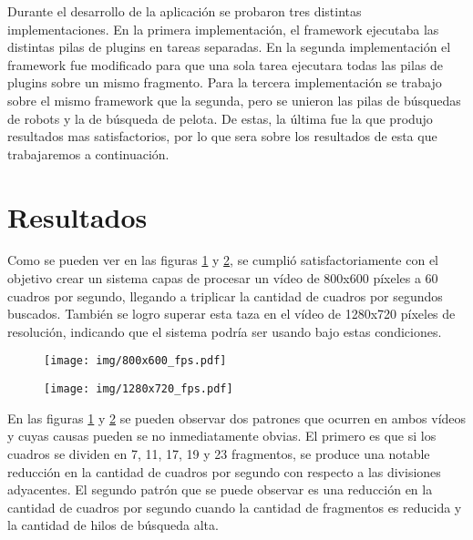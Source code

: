 Durante el desarrollo de la aplicación se probaron tres distintas
implementaciones. En la primera implementación, el framework ejecutaba las
distintas pilas de plugins en tareas separadas. En la segunda implementación el
framework fue modificado para que una sola tarea ejecutara todas las pilas de
plugins sobre un mismo fragmento. Para la tercera implementación se trabajo
sobre el mismo framework que la segunda, pero se unieron las pilas de búsquedas
de robots y la de búsqueda de pelota. De estas, la última fue la que produjo
resultados mas satisfactorios, por lo que sera sobre los resultados de esta que
trabajaremos a continuación.

\section{Resultados}

Como se pueden ver en las figuras \ref{800fps} y \ref{1280fps}, se cumplió
satisfactoriamente con el objetivo crear un sistema capas de procesar un vídeo
de 800x600 píxeles a 60 cuadros por segundo, llegando a triplicar la cantidad de
cuadros por segundos buscados. También se logro superar esta taza en el vídeo de
1280x720 píxeles de resolución, indicando que el sistema podría ser usando bajo
estas condiciones.

\begin{figure}[!h]

	\texttt{[image: img/800x600\_fps.pdf]}
	\caption{}
	\label{800fps}

\end{figure}

\begin{figure}[!h]

	\texttt{[image: img/1280x720\_fps.pdf]}
	\caption{}
	\label{1280fps}

\end{figure}

En las figuras \ref{800fps} y \ref{1280fps} se pueden observar dos patrones que
ocurren en ambos vídeos y cuyas causas pueden se no inmediatamente obvias. El
primero es que si los cuadros se dividen en 7, 11, 17, 19 y 23 fragmentos, se
produce una notable reducción en la cantidad de cuadros por segundo con respecto
a las divisiones adyacentes. El segundo patrón que se puede observar es una
reducción en la cantidad de cuadros por segundo cuando la cantidad de fragmentos
es reducida y la cantidad de hilos de búsqueda alta.

